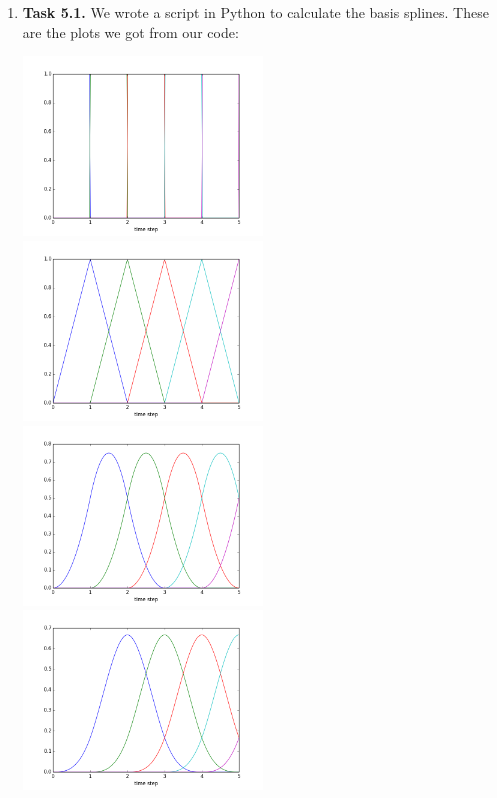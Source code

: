 \documentclass[a4paper,11pt]{article}
\author{\authorinfo}
\title{\titleinfo}
\date{\today}
\begin{document}
\maketitle
\begin {enumerate}
	\item[\textbf{Task 5.1.}]
		We wrote a script in Python to calculate the basis splines. These are the plots we got from our code:
		
		\includegraphics[width=0.5\textwidth]{5-1-k=1}
		\includegraphics[width=0.5\textwidth]{5-1-k=2}
		\includegraphics[width=0.5\textwidth]{5-1-k=3}
		\includegraphics[width=0.5\textwidth]{5-1-k=4}
		

\end{enumerate}
\end{document}
